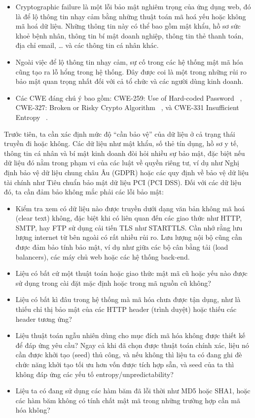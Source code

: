 \begin{itemize}
    \item Cryptographic failure là một lỗi bảo mật nghiêm trọng của ứng dụng web, đó là để lộ thông tin nhạy cảm bằng những thuật toán mã hoá yếu hoặc không mã hoá dữ liệu. Những thông tin này có thể bao gồm mật khẩu, hồ sơ sức khoẻ bệnh nhân, thông tin bí mật doanh nghiệp, thông tin thẻ thanh toán, địa chỉ email, … và các thông tin cá nhân khác.
    \item Ngoài việc để lộ thông tin nhạy cảm, sự cố trong các hệ thống mật mã hóa cũng tạo ra lỗ hổng trong hệ thống. Đây được coi là một trong những rủi ro bảo mật quan trọng nhất đối với cả tổ chức và các người dùng kinh doanh.
    \item Các CWE đáng chú ý bao gồm: CWE-259: Use of Hard-coded Password ~\cite{chap2bib9}, CWE-327: Broken or Risky Crypto Algorithm ~\cite{chap2bib10}, và CWE-331 Insufficient Entropy ~\cite{chap2bib11}.
\end{itemize}

\tab \tab Trước tiên, ta cần xác định mức độ “cần bảo vệ” của dữ liệu ở cả trạng thái truyền đi hoặc không. Các dữ liệu như mật khẩu, số thẻ tín dụng, hồ sơ y tế, thông tin cá nhân và bí mật kinh doanh đòi hỏi nhiều sự bảo mật, đặc biệt nếu dữ liệu đó nằm trong phạm vi của các luật về quyền riêng tư, ví dụ như Nghị định bảo vệ dữ liệu chung châu Âu (GDPR) hoặc các quy định về bảo vệ dữ liệu tài chính như Tiêu chuẩn bảo mật dữ liệu PCI (PCI DSS). Đối với các dữ liệu đó, ta cần đảm bảo không mắc phải các lỗi bảo mật:

\begin{itemize}
    \item Kiểm tra xem có dữ liệu nào được truyền dưới dạng văn bản không mã hoá (clear text) không, đặc biệt khi có liên quan đến các giao thức như HTTP, SMTP, hay FTP sử dụng cải tiến TLS như STARTTLS. Cần nhớ rằng lưu lượng internet từ bên ngoài có rất nhiều rủi ro. Lưu lượng nội bộ cũng cần được đảm bảo tính bảo mật, ví dụ như giữa các bộ cân bằng tải (load balancers), các máy chủ web hoặc các hệ thống back-end.
    \item Liệu có bất cứ một thuật toán hoặc giao thức mật mã cũ hoặc yếu nào được sử dụng trong cài đặt mặc định hoặc trong mã nguồn cũ không?
    \item Liệu có bất kì đâu trong hệ thống mà mã hóa chưa được tận dụng, như là thiếu chỉ thị bảo mật của các HTTP header (trình duyệt) hoặc thiếu các header tương ứng?
    \item Liệu thuật toán ngẫu nhiên dùng cho mục đích mã hóa không được thiết kế để đáp ứng yêu cầu? Ngay cả khi đã chọn được thuật toán chính xác, liệu nó cần được khởi tạo (seed) thủ công, và nếu không thì liệu ta có đang ghi đè chức năng khởi tạo tối ưu hơn vốn được tích hợp sẵn, và seed của ta thì không đáp ứng các yếu tố entropy/unpredictability?
    \item Liệu ta có đang sử dụng các hàm băm đã lỗi thời như MD5 hoặc SHA1, hoặc các hàm băm không có tính chất mật mã trong những trường hợp cần mã hóa không?
\end{itemize}

